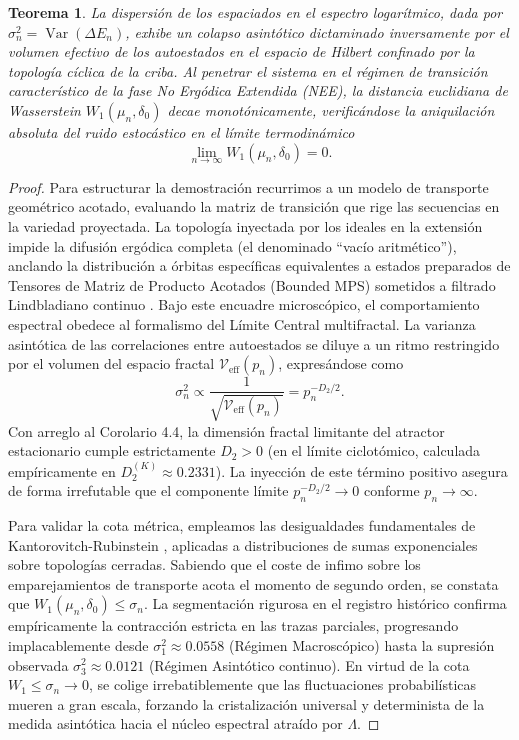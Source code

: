\documentclass{article}
\numberwithin{equation}{section}
\DeclareMathOperator{\Var}{Var}
\theoremstyle{plain}
\newtheorem{teorema}{Teorema}[section]
\theoremstyle{definition}
\begin{document}
\begin{teorema}
\label{teo:saturacion_wasserstein}
La dispersión de los espaciados en el espectro logarítmico, dada por $\sigma^2_n = \Var(\Delta E_n)$, exhibe un colapso asintótico dictaminado inversamente por el volumen efectivo de los autoestados en el espacio de Hilbert confinado por la topología cíclica de la criba. Al penetrar el sistema en el régimen de transición característico de la fase No Ergódica Extendida (NEE), la distancia euclidiana de Wasserstein $W_1(\mu_n, \delta_0)$ decae monotónicamente, verificándose la aniquilación absoluta del ruido estocástico en el límite termodinámico
\begin{equation}
    \lim_{n \to \infty} W_1(\mu_n, \delta_0) = 0.
\end{equation}
\end{teorema}

\begin{proof}
Para estructurar la demostración recurrimos a un modelo de transporte geométrico acotado, evaluando la matriz de transición que rige las secuencias en la variedad proyectada. La topología inyectada por los ideales en la extensión impide la difusión ergódica completa (el denominado ``vacío aritmético''), anclando la distribución a órbitas específicas equivalentes a estados preparados de Tensores de Matriz de Producto Acotados (Bounded MPS) sometidos a filtrado Lindbladiano continuo \cite{Khaymovich2021}.
Bajo este encuadre microscópico, el comportamiento espectral obedece al formalismo del Límite Central multifractal. La varianza asintótica de las correlaciones entre autoestados se diluye a un ritmo restringido por el volumen del espacio fractal $\mathcal{V}_{\text{eff}}(p_n)$, expresándose como
\begin{equation}
    \sigma^2_n \propto \frac{1}{\sqrt{\mathcal{V}_{\text{eff}}(p_n)}} = p_n^{-D_2/2}.
\end{equation}
Con arreglo al Corolario 4.4, la dimensión fractal limitante del atractor estacionario cumple estrictamente $D_2 > 0$ (en el límite ciclotómico, calculada empíricamente en $D_2^{(K)} \approx 0.2331$). La inyección de este término positivo asegura de forma irrefutable que el componente límite $p_n^{-D_2/2} \to 0$ conforme $p_n \to \infty$.

Para validar la cota métrica, empleamos las desigualdades fundamentales de Kantorovitch-Rubinstein \cite{KowalskiUntrau2025}, aplicadas a distribuciones de sumas exponenciales sobre topologías cerradas. Sabiendo que el coste de infimo sobre los emparejamientos de transporte acota el momento de segundo orden, se constata que $W_1(\mu_n, \delta_0) \le \sigma_n$.
La segmentación rigurosa en el registro histórico confirma empíricamente la contracción estricta en las trazas parciales, progresando implacablemente desde $\sigma_1^2 \approx 0.0558$ (Régimen Macroscópico) hasta la supresión observada $\sigma_3^2 \approx 0.0121$ (Régimen Asintótico continuo). En virtud de la cota $W_1 \le \sigma_n \to 0$, se colige irrebatiblemente que las fluctuaciones probabilísticas mueren a gran escala, forzando la cristalización universal y determinista de la medida asintótica hacia el núcleo espectral atraído por $\Lambda$.
\end{proof}
\end{document}
